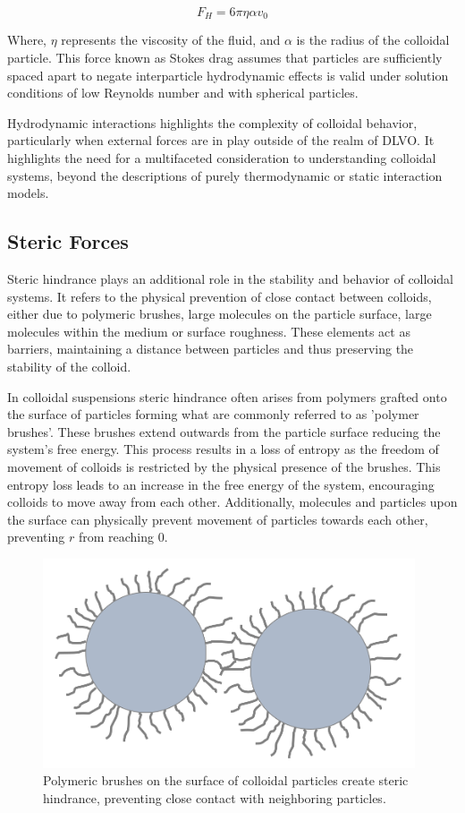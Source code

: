 \begin{equation}
F_H = 6 \pi \eta \alpha v_0
\end{equation}

Where, \( \eta \) represents the viscosity of the fluid, and \( \alpha \) is the radius of the colloidal particle. This force known as Stokes drag assumes that particles are sufficiently spaced apart to negate interparticle hydrodynamic effects is valid under solution conditions of low Reynolds number and with spherical particles.\cite{HydrodynamicReference}

Hydrodynamic interactions highlights the complexity of colloidal behavior, particularly when external forces are in play outside of the realm of DLVO. It highlights the need for a multifaceted consideration to understanding colloidal systems, beyond the descriptions of purely thermodynamic or static interaction models.

\subsection{Steric Forces}

Steric hindrance plays an additional role in the stability and behavior of colloidal systems. It refers to the physical prevention of close contact between colloids, either due to polymeric brushes, large molecules on the particle surface, large molecules within the medium or surface roughness. These elements act as barriers, maintaining a distance between particles and thus preserving the stability of the colloid.

In colloidal suspensions steric hindrance often arises from polymers grafted onto the surface of particles forming what are commonly referred to as 'polymer brushes'. These brushes extend outwards from the particle surface reducing the system's free energy. This process results in a loss of entropy as the freedom of movement of colloids is restricted by the physical presence of the brushes. This entropy loss leads to an increase in the free energy of the system, encouraging colloids to move away from each other. Additionally, molecules and particles upon the surface can physically prevent movement of particles towards each other, preventing $r$ from reaching 0. 

\begin{figure}[h!!!!]
    \centering
    \includegraphics[width=110mm]{chapter1/brushy.PNG}
    \caption{Polymeric brushes on the surface of colloidal particles create steric hindrance, preventing close contact with neighboring particles.}
    \label{fig:brushy}
\end{figure}

